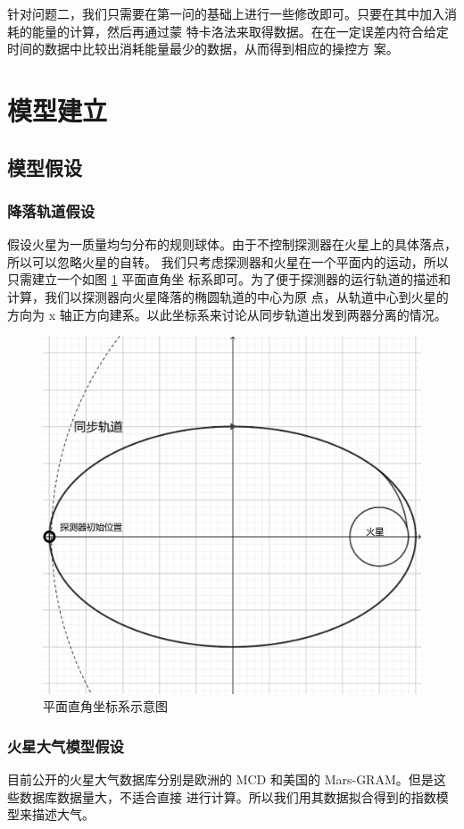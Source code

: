 \documentclass[hyperref,a4paper,UTF8]{ctexart}
\begin{document}
针对问题二，我们只需要在第一问的基础上进行一些修改即可。只要在其中加入消耗的能量的计算，然后再通过蒙
特卡洛法来取得数据。在在一定误差内符合给定时间的数据中比较出消耗能量最少的数据，从而得到相应的操控方
案。
\section{模型建立}
\subsection{模型假设}
\subsubsection{降落轨道假设}
假设火星为一质量均匀分布的规则球体。由于不控制探测器在火星上的具体落点，所以可以忽略火星的自转。
我们只考虑探测器和火星在一个平面内的运动，所以只需建立一个如图 \ref{pic:syt0} 平面直角坐
标系即可。为了便于探测器的运行轨道的描述和计算，我们以探测器向火星降落的椭圆轨道的中心为原
点，从轨道中心到火星的方向为 x 轴正方向建系。以此坐标系来讨论从同步轨道出发到两器分离的情况。
\begin{figure}[hb]
    \centering
    \includegraphics[scale=0.5]{建系示意图0.pdf}
    \caption{平面直角坐标系示意图}
    \label{pic:syt0}
\end{figure}
\subsubsection{火星大气模型假设}
目前公开的火星大气数据库分别是欧洲的 MCD 和美国的 Mars-GRAM。但是这些数据库数据量大，不适合直接
进行计算。所以我们用其数据拟合得到的指数模型来描述大气。
\end{document}
